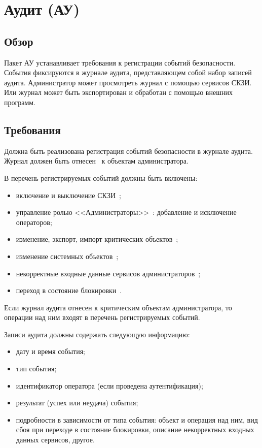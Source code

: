 \section{Аудит (АУ)}\label{AU}

\subsection{Обзор}\label{AU.Defs}

Пакет АУ устанавливает требования к регистрации событий безопасности.
События фиксируются в журнале аудита, представляющем собой набор 
записей аудита.
%
Администратор может просмотреть журнал с помощью сервисов СКЗИ.
Или журнал может быть экспортирован и обработан с помощью внешних программ.

\subsection{Требования}\label{AU.Reqs}


\label{R.AU.Log} %
Должна быть реализована регистрация событий безопасности в журнале аудита. 
Журнал должен быть отнесен~ к объектам 
администратора.

\label{R.AU.Events} %
В перечень регистрируемых событий должны быть включены:
\begin{itemize} 
\item
включение и выключение СКЗИ~;
\item
управление ролью <<Администраторы>>~: 
добавление и исключение операторов; 
\item
изменение, экспорт, импорт критических объектов~; 
\item
изменение системных объектов~; 
\item
некорректные входные данные сервисов администраторов~;
\item
переход в состояние блокировки~.
\end{itemize}

\begin{note*}
Если журнал аудита отнесен к критическим объектам администратора, 
то операции над ним входят в перечень регистрируемых событий.
\end{note*}

\label{R.AU.Records} %
Записи аудита должны содержать следующую информацию:
\begin{itemize} 
\item
дату и время события;
\item
тип события; 
\item
идентификатор оператора (если проведена аутентификация); 
\item
результат (успех или неудача) события; 
\item
подробности в зависимости от типа события:
объект и операция над ним,
вид сбоя при переходе в состояние блокировки,
описание некорректных входных данных сервисов,
другое.
\end{itemize}

